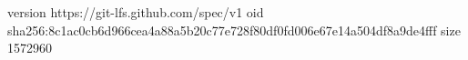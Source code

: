 version https://git-lfs.github.com/spec/v1
oid sha256:8c1ac0cb6d966cea4a88a5b20c77e728f80df0fd006e67e14a504df8a9de4fff
size 1572960

